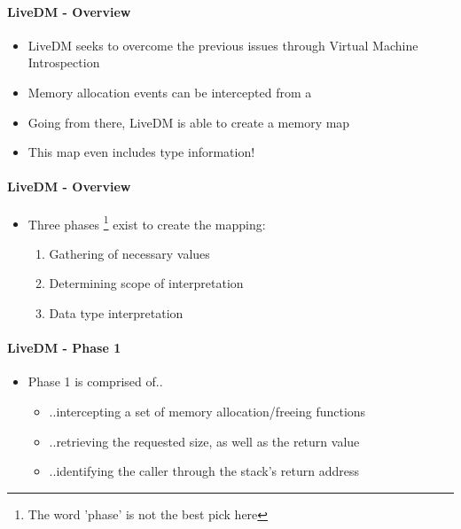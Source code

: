 \documentclass{i20lecture}
\begin{document}
\begin{frame}{\insertsection}
  \framesubtitle{LiveDM - Overview}
  
  \begin{itemize}
    \item LiveDM seeks to overcome the previous issues through Virtual Machine Introspection
\pause
    \item Memory allocation events can be intercepted from a
\pause
    \item Going from there, LiveDM is able to create a memory map
\pause
    \item This map even includes type information!
  \end{itemize}
\end{frame}

\begin{frame}{\insertsection}
  \framesubtitle{LiveDM - Overview}
  
  \begin{itemize}
    \item Three phases \footnote{The word 'phase' is not the best pick here} exist to create the mapping:
    \begin{enumerate}
\pause
     \item Gathering of necessary values
\pause
     \item Determining scope of interpretation
\pause
     \item Data type interpretation
    \end{enumerate}
  \end{itemize}
\end{frame}

\begin{frame}{\insertsection}
  \framesubtitle{LiveDM - Phase 1}
  
  \begin{itemize}
    \item Phase 1 is comprised of..
    \begin{itemize}
\pause
     \item ..intercepting a set of memory allocation/freeing functions
\pause
     \item ..retrieving the requested size, as well as the return value
\pause
     \item ..identifying the caller through the stack's return address
    \end{itemize}
  \end{itemize}
\end{frame}
\end{document}
